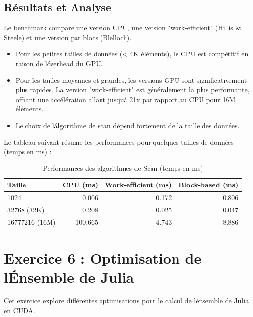 \documentclass[a4paper,11pt]{article}
\begin{document}
\subsection{Résultats et Analyse}
Le benchmark compare une version CPU, une version "work-efficient" (Hillis & Steele) et une version par blocs (Blelloch).
\begin{itemize}
    \item Pour les petites tailles de données (< 4K éléments), le CPU est compétitif en raison de l\'overhead du GPU.
    \item Pour les tailles moyennes et grandes, les versions GPU sont significativement plus rapides. La version "work-efficient" est généralement la plus performante, offrant une accélération allant jusqu\'à 21x par rapport au CPU pour 16M éléments.
    \item Le choix de l\'algorithme de scan dépend fortement de la taille des données.
\end{itemize}

Le tableau suivant résume les performances pour quelques tailles de données (temps en ms) :

\begin{table}[H]
\centering
\begin{tabular}{@{}lrrr@{}}
\toprule
\textbf{Taille} & \textbf{CPU (ms)} & \textbf{Work-efficient (ms)} & \textbf{Block-based (ms)} \\
\midrule
1024 & 0.006 & 0.172 & 0.806 \\
32768 (32K) & 0.208 & 0.025 & 0.047 \\
16777216 (16M) & 100.665 & 4.743 & 8.886 \\
\bottomrule
\end{tabular}
\caption{Performances des algorithmes de Scan (temps en ms)}
\label{tab:scan_performance}
\end{table}

\section{Exercice 6 : Optimisation de l\'Ensemble de Julia}
Cet exercice explore différentes optimisations pour le calcul de l\'ensemble de Julia en CUDA.
\end{document}
